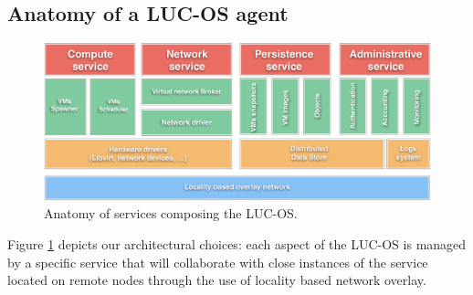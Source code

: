 \subsection{Anatomy of a LUC-OS agent}

\begin{figure}
	\centerline{
	 \includegraphics[width=1.25\linewidth]{Figures/luc_os_anatomy.pdf}
  }
	\caption{Anatomy of services composing the LUC-OS.}%
	\label{fig:anatomy}%
\end{figure}


\label{sec:anatomy_lucos}
Figure \ref{fig:anatomy} depicts our architectural choices: each aspect of the 
LUC-OS is managed by a specific service that will collaborate with close 
instances of the service located on remote nodes through the use of locality
based network overlay. 

